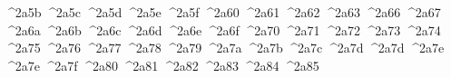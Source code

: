 {  ^^^^2a5b%
  ^^^^2a5c%
  ^^^^2a5d%
  ^^^^2a5e%
  ^^^^2a5f%
  ^^^^2a60%
  ^^^^2a61%
  ^^^^2a62%
  ^^^^2a63%
  ^^^^2a66%
  ^^^^2a67%
  ^^^^2a6a%
  ^^^^2a6b%
  ^^^^2a6c%
  ^^^^2a6d%
  ^^^^2a6e%
  ^^^^2a6f%
  ^^^^2a70%
  ^^^^2a71%
  ^^^^2a72%
  ^^^^2a73%
  ^^^^2a74%
  ^^^^2a75%
  ^^^^2a76%
  ^^^^2a77%
  ^^^^2a78%
  ^^^^2a79%
  ^^^^2a7a%
  ^^^^2a7b%
  ^^^^2a7c%
  ^^^^2a7d%
  ^^^^2a7d%
  ^^^^2a7e%
  ^^^^2a7e%
  ^^^^2a7f%
  ^^^^2a80%
  ^^^^2a81%
  ^^^^2a82%
  ^^^^2a83%
  ^^^^2a84%
  ^^^^2a85%
}
